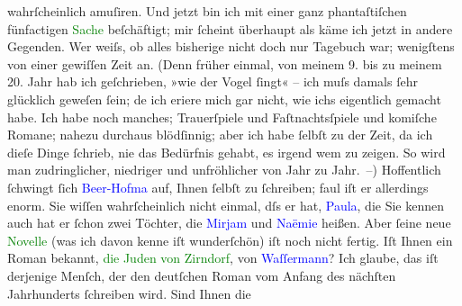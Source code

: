                     wahrſcheinlich amuſiren.\pend
           \pstart
           Und jetzt bin ich mit einer ganz phantaſtiſchen {\pb}fünfactigen \textcolor{green}{Sache}{} beſchäftigt; mir ſcheint überhaupt als käme ich
                    jetzt in andere Gegenden. Wer weiſs, ob alles bisherige nicht doch nur Tagebuch
                    war; wenigſtens von einer gewiſſen Zeit an. (Denn früher einmal, von meinem 9.
                    bis zu meinem 20. Jahr hab ich geſchrieben, »wie der Vogel ſingt« – ich muſs
                    damals ſehr glücklich geweſen ſein; de{\geminationn} ich eri{\geminationn}ere mich gar nicht, wie ichs eigentlich gemacht
                    habe. Ich habe noch manches; Trauerſpiele und Faſtnachtsſpiele und {\pb}komiſche Romane; nahezu durchaus blödſinnig;
                    aber ich habe ſelbſt zu der Zeit, da ich dieſe Dinge ſchrieb, nie das Bedürfnis
                    gehabt, es irgend wem zu zeigen. So wird man zudringlicher, niedriger und
                    unfröhlicher von Jahr zu Jahr. –)\pend
           \pstart
           Hoffentlich ſchwingt ſich \textcolor{blue}{Beer-Hofma{\geminationn}}{}\ledrightnote{\textcolor{blue}{Richard Beer-Hofmann}} auf, Ihnen ſelbſt zu ſchreiben; faul iſt er allerdings enorm. Sie wiſſen
                    wahrſcheinlich nicht einmal, dſs er \label{K_L00880_3v}\label{K_L00880_3h} hat, \textcolor{blue}{Paula}{}\ledrightnote{\textcolor{blue}{Paula Beer-Hofmann}}, die Sie kennen {\pb}auch hat er
                    ſchon zwei Töchter, die \textcolor{blue}{Mirjam}{}\ledrightnote{\textcolor{blue}{Mirjam Beer-Hofmann}} und \textcolor{blue}{Naëmie}{}\ledrightnote{\textcolor{blue}{Naëmah Beer-Hofmann}} heißen. Aber ſeine neue \textcolor{green}{Novelle}{} (was ich davon kenne
                    iſt wunderſchön) iſt noch nicht fertig.\pend
           \pstart
           Iſt Ihnen ein Roman bekannt, \textcolor{green}{die Juden von
                        Zirndorf}{}\ledrightnote{\textcolor{green}{Die Juden von Zirndorf}}, von \textcolor{blue}{Waſſermann}{}\ledrightnote{\textcolor{blue}{Jakob Wassermann}}? Ich
                    glaube, das iſt derjenige Menſch, der den \introOben{}deutſchen\introOben{}
                    Roman vom Anfang des nächſten Jahrhunderts ſchreiben wird. Sind Ihnen die
